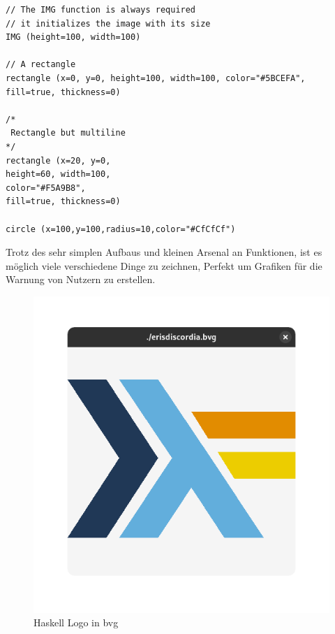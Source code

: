 \begin{verbatim}
// The IMG function is always required
// it initializes the image with its size
IMG (height=100, width=100)

// A rectangle 
rectangle (x=0, y=0, height=100, width=100, color="#5BCEFA", fill=true, thickness=0)

/*
 Rectangle but multiline
*/
rectangle (x=20, y=0,
height=60, width=100,
color="#F5A9B8",
fill=true, thickness=0)

circle (x=100,y=100,radius=10,color="#CfCfCf")
\end{verbatim}
Trotz des sehr simplen Aufbaus und kleinen Arsenal an Funktionen, ist es möglich viele verschiedene Dinge zu zeichnen, Perfekt um Grafiken für die Warnung von Nutzern zu erstellen.

\hypersetup{pageanchor=false}
\begin{figure}[h]
  \centering
  \begin{minipage}[c]{0.4\linewidth}
    \includegraphics[width=\linewidth]{realisierung/images/bvg-haskell.png}
    \caption{Haskell Logo in bvg}
  \end{minipage}
  \hfill
  \begin{minipage}[c]{0.4\linewidth}

\end{minipage}
\end{figure}
